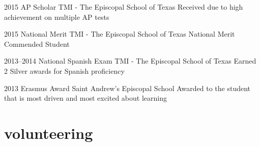 \documentclass[]{friggeri-cv} %
\begin{document}
\begin{entrylist}

	\entry
	{2015}
	{AP Scholar}
	{TMI - The Episcopal School of Texas}
	{Received due to high achievement on multiple AP tests}


	\entry
	{2015}
	{National Merit}
	{TMI - The Episcopal School of Texas}
	{National Merit Commended Student}


	\entry
	{2013--2014}
	{National Spanish Exam}
	{TMI - The Episcopal School of Texas}
	{Earned 2 Silver awards for Spanish proficiency}


	\entry
	{2013}
	{Erasmus Award}
	{Saint Andrew's Episcopal School}
	{Awarded to the student that is most driven and most excited about learning}

\end{entrylist}


\section{volunteering}
\end{document}
